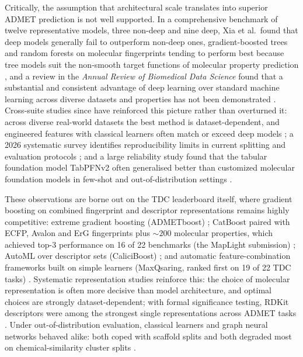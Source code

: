 Critically, the assumption that architectural scale translates into superior ADMET prediction is not well supported. In a comprehensive benchmark of twelve representative models, three non-deep and nine deep, Xia et al.\ found that deep models generally fail to outperform non-deep ones, gradient-boosted trees and random forests on molecular fingerprints tending to perform best because tree models suit the non-smooth target functions of molecular property prediction \cite{xia2023understanding}, and a review in the \emph{Annual Review of Biomedical Data Science} found that a substantial and consistent advantage of deep learning over standard machine learning across diverse datasets and properties has not been demonstrated \cite{rodriguezperez2022machine}. Cross-suite studies since have reinforced this picture rather than overturned it: across diverse real-world datasets the best method is dataset-dependent, and engineered features with classical learners often match or exceed deep models \cite{green2023current}; a 2026 systematic survey identifies reproducibility limits in current splitting and evaluation protocols \cite{li2026systematic}; and a large reliability study found that the tabular foundation model TabPFNv2 often generalised better than customized molecular foundation models in few-shot and out-of-distribution settings \cite{zhao2026revisiting}.

These observations are borne out on the TDC leaderboard itself, where gradient boosting on combined fingerprint and descriptor representations remains highly competitive: extreme gradient boosting (ADMETboost) \cite{tian2022admetboost}; CatBoost paired with ECFP, Avalon and ErG fingerprints plus ${\sim}200$ molecular properties, which achieved top-3 performance on 16 of 22 benchmarks (the MapLight submission) \cite{notwell2023admet}; AutoML over descriptor sets (CaliciBoost) \cite{le2025caliciboost}; and automatic feature-combination frameworks built on simple learners (MaxQsaring, ranked first on 19 of 22 TDC tasks) \cite{xu2025maxqsaring}. Systematic representation studies reinforce this: the choice of molecular representation is often more decisive than model architecture, and optimal choices are strongly dataset-dependent; with formal significance testing, RDKit descriptors were among the strongest single representations across ADMET tasks \cite{kamuntavicius2025benchmarking}. Under out-of-distribution evaluation, classical learners and graph neural networks behaved alike: both coped with scaffold splits and both degraded most on chemical-similarity cluster splits \cite{fooladi2025evaluating}.


